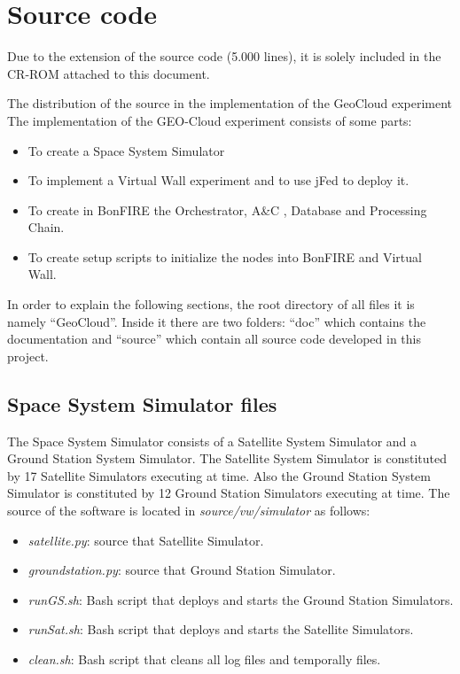 \chapter{Source code}

Due to the extension of the source code (5.000 lines), it is solely included
in the CR-ROM attached to this document.

The distribution of the source in the implementation of the GeoCloud experiment
The implementation of the GEO-Cloud experiment consists of some parts:
\begin{itemize}
\item To create a Space System Simulator 
\item To implement a Virtual Wall experiment and to use jFed to deploy it.
\item To create in BonFIRE the Orchestrator, A\&C , Database and Processing Chain. 
\item To create setup scripts to initialize the nodes into BonFIRE and Virtual Wall.
\end{itemize}

In order to explain the following sections, the root directory of all files it
is namely ``GeoCloud''. Inside it there are two folders: ``doc'' which contains
the documentation and ``source'' which contain all source code developed in this
project.

\section{Space System Simulator files}

The Space System Simulator consists of a Satellite System Simulator and a Ground
Station System Simulator. The Satellite System Simulator is constituted by 17
Satellite Simulators executing at time. Also the Ground Station System Simulator
is constituted by 12 Ground Station Simulators executing at time. The source of
the software is located in \emph{source/vw/simulator} as follows:
\begin{itemize}
\item \emph{satellite.py}: source that Satellite Simulator.
\item \emph{groundstation.py}: source that Ground Station Simulator.
\item \emph{runGS.sh}: Bash script that deploys and starts the Ground Station Simulators.
\item \emph {runSat.sh}: Bash script that deploys and starts the Satellite Simulators.
\item \emph {clean.sh}: Bash script that cleans all log files and temporally files.
\end{itemize}

